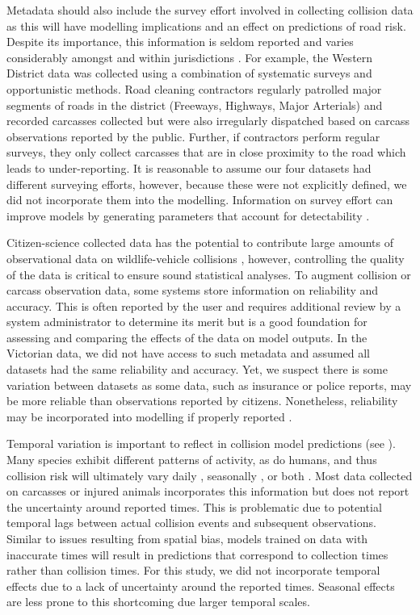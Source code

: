 Metadata should also include the survey effort involved in collecting collision data as this will have modelling implications and an effect on predictions of road risk. Despite its importance, this information is seldom reported and varies considerably amongst and within jurisdictions \citep{huij07a}. For example, the Western District data was collected using a combination of systematic surveys and opportunistic methods. Road cleaning contractors regularly patrolled major segments of roads in the district (Freeways, Highways, Major Arterials) and recorded carcasses collected but were also irregularly dispatched based on carcass observations reported by the public. Further, if contractors perform regular surveys, they only collect carcasses that are in close proximity to the road which leads to under-reporting. It is reasonable to assume our four datasets had different surveying efforts, however, because these were not explicitly defined, we did not incorporate them into the modelling. Information on survey effort can improve models by generating parameters that account for detectability \citep{dora14}.

Citizen-science collected data has the potential to contribute large amounts of observational data on wildlife-vehicle collisions \citep{cose14,dwye16,paul14}, however, controlling the quality of the data is critical to ensure sound statistical analyses. To augment collision or carcass observation data, some systems store information on reliability and accuracy. This is often reported by the user and requires additional review by a system administrator to determine its merit but is a good foundation for assessing and comparing the effects of the data on model outputs. In the Victorian data, we did not have access to such metadata and assumed all datasets had the same reliability and accuracy. Yet, we suspect there is some variation between datasets as some data, such as insurance or police reports, may be more reliable than observations reported by citizens. Nonetheless, reliability may be incorporated into modelling if properly reported \citep{guns09}.

Temporal variation is important to reflect in collision model predictions (see ). Many species exhibit different patterns of activity, as do humans, and thus collision risk will ultimately vary daily \citep{joyc01}, seasonally \citep{alve12,beau10,gril09}, or both \citep{mizu14,more13}. Most data collected on carcasses or injured animals incorporates this information but does not report the uncertainty around reported times. This is problematic due to potential temporal lags between actual collision events and subsequent observations. Similar to issues resulting from spatial bias, models trained on data with inaccurate times will result in predictions that correspond to collection times rather than collision times. For this study, we did not incorporate temporal effects due to a lack of uncertainty around the reported times. Seasonal effects are less prone to this shortcoming due larger temporal scales. 

